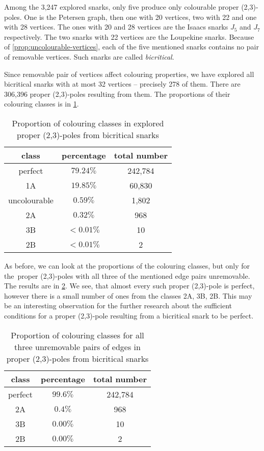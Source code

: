 Among the 3,247 explored snarks, only five produce only colourable proper (2,3)-poles. One is the Petersen graph, then one with 20 vertices, two with 22 and one with 28 vertices. The ones with 20 and 28 vertices are the Isaacs snarks $J_5$ and $J_7$ respectively. The two snarks with 22 vertices are the Loupekine snarks. Because of \cref{prop:uncolourable-vertices}, each of the five mentioned snarks contains no pair of removable vertices. Such snarks are called \textit{bicritical}.

Since removable pair of vertices affect colouring properties, we have explored all bicritical snarks with at most 32 vertices -- precisely 278 of them. There are 306,396 proper (2,3)-poles resulting from them. The proportions of their colouring classes is in \cref{tab:proportion-bicritical}.

\begin{table}[h!]
	\centering
	\begin{tabular}{ |c|c|c| } 
		\hline
		class & percentage & total number \\ [0.5ex] 
		\hline\hline
		perfect & $79.24\%$ & 242,784 \\ 
		\hline
		1A & $19.85\%$ & 60,830 \\ 
		\hline
		uncolourable & $0.59\%$ & 1,802 \\ 
		\hline
		2A & $0.32\%$ & 968 \\ 
		\hline
		3B & $< 0.01\%$ & 10 \\ 
		\hline
		2B & $< 0.01\%$ & 2 \\ 
		\hline
	\end{tabular}
	\caption{Proportion of colouring classes in explored proper (2,3)-poles from bicritical snarks}
	\label{tab:proportion-bicritical}
\end{table}

As before, we can look at the proportions of the colouring classes, but only for the~proper (2,3)-poles with all three of the mentioned edge pairs unremovable. The results are in \cref{tab:proportion-bicritical-all-unremovable}. We see, that almost every such proper (2,3)-pole is perfect, however there is a small number of ones from the classes 2A, 3B, 2B. This may be an interesting observation for the further research about the sufficient conditions for a proper (2,3)-pole resulting from a bicritical snark to be perfect.

\begin{table}[h!]
	\centering
	\begin{tabular}{ |c|c|c| } 
		\hline
		class & percentage & total number \\ [0.5ex] 
		\hline\hline
		perfect & $99.6\%$ & 242,784 \\ 
		\hline
		2A & $0.4\%$ & 968 \\ 
		\hline
		3B & $0.00\%$ & 10 \\ 
		\hline
		2B & $0.00\%$ & 2 \\ 
		\hline
	\end{tabular}
	\caption{Proportion of colouring classes for all three unremovable pairs of edges in proper (2,3)-poles from bicritical snarks}
	\label{tab:proportion-bicritical-all-unremovable}
\end{table}